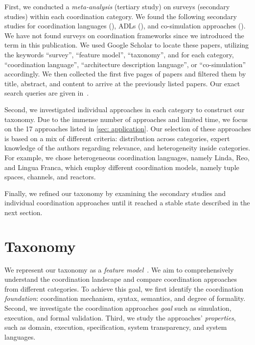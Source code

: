 \documentclass[runningheads]{llncs}
\newcommand{\quotes}[1]{``#1''}
\begin{document}
First, we conducted a \textit{meta-analysis} (tertiary study) on surveys (secondary studies) within each coordination category.
We found the following  secondary studies for coordination languages (\cite{papadopoulosCoordinationModelsLanguages1998,goosCoordinationModelsLanguages2001,rossiTuplebasedTechnologiesCoordination2001}), ADLs (\cite{clementsSurveyArchitectureDescription1996,medvidovicClassificationComparisonFramework2000,hussainInvestigatingArchitectureDescription2013,ozkayaAreWeThere2013,malavoltaWhatIndustryNeeds2013}), and co-simulation approaches (\cite{gomesCoSimulationSurvey2019,schweigerEmpiricalSurveyCosimulation2019,hafnerOverviewStateArt2021}).
We have not found surveys on coordination frameworks since we introduced the term in this publication.
We used Google Scholar to locate these papers, utilizing the keywords \quotes{survey}, \quotes{feature model}, \quotes{taxonomy}, and for each category, \quotes{coordination language}, \quotes{architecture description language}, or \quotes{co-simulation} accordingly.
We then collected the first five pages of papers and filtered them by title, abstract, and content to arrive at the previously listed papers.
Our exact search queries are given in~\cite{timkrauterArtifactsCoordination2024}.

Second, we investigated individual approaches in each category to construct our taxonomy.
Due to the immense number of approaches and limited time, we focus on the 17 approaches listed in \autoref{sec: application}.
Our selection of these approaches is based on a mix of different criteria: distribution across categories, expert knowledge of the authors regarding relevance, and heterogeneity inside categories.
For example, we chose heterogeneous coordination languages, namely Linda, Reo, and Lingua Franca, which employ different coordination models, namely tuple spaces, channels, and reactors.

Finally, we refined our taxonomy by examining the secondary studies and individual coordination approaches until it reached a stable state described in the next section.

\section{Taxonomy} \label{sec: taxonomy}
We represent our taxonomy as a \textit{feature model}~\cite{kangFeatureOrientedDomainAnalysis1990}.
We aim to comprehensively understand the coordination landscape and compare coordination approaches from different categories.
To achieve this goal, we first identify the coordination \textit{foundation}: coordination mechanism, syntax, semantics, and degree of formality.
Second, we investigate the coordination approaches \textit{goal} such as simulation, execution, and formal validation.
Third, we study the approaches' \textit{properties}, such as domain, execution, specification, system transparency, and system languages.
\end{document}
